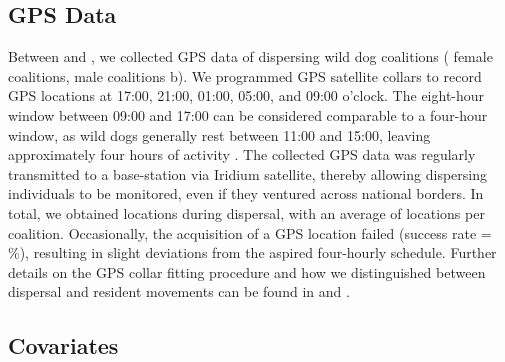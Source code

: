 \documentclass[abstract=on,10pt,a4paper,bibliography=totocnumbered]{article}
\newcommand{\inputy}[1]{\unskip}
\begin{document}
\subsection{GPS Data}

Between \inputy{GeneralMetrics/GPSFromYear} and
\inputy{GeneralMetrics/GPSToYear}, we collected GPS data of
\inputy{GeneralMetrics/CollarsTotal} dispersing wild dog coalitions
(\inputy{GeneralMetrics/CollarsFemales} female coalitions,
\inputy{GeneralMetrics/CollarsMales} male coalitions b). We
programmed GPS satellite collars to record GPS locations at 17:00, 21:00, 01:00,
05:00, and 09:00 o'clock. The eight-hour window between 09:00 and 17:00 can be
considered comparable to a four-hour window, as wild dogs generally rest between
11:00 and 15:00, leaving approximately four hours of activity
\citep{Hayward.2009}. The collected GPS data was regularly transmitted to a
base-station via Iridium satellite, thereby allowing dispersing individuals to
be monitored, even if they ventured across national borders. In total, we
obtained \inputy{GeneralMetrics/FixesTotal} locations during dispersal, with an
average of \inputy{GeneralMetrics/FixesMeanSD} locations per coalition.
Occasionally, the acquisition of a GPS location failed (success rate =
\inputy{GeneralMetrics/AcquisitionRate}\%), resulting in slight deviations from
the aspired four-hourly schedule. Further details on the GPS collar fitting
procedure and how we distinguished between dispersal and resident movements can
be found in \citet{Cozzi.2020} and \citet{Hofmann.2021}.

\subsection{Covariates}
\end{document}

